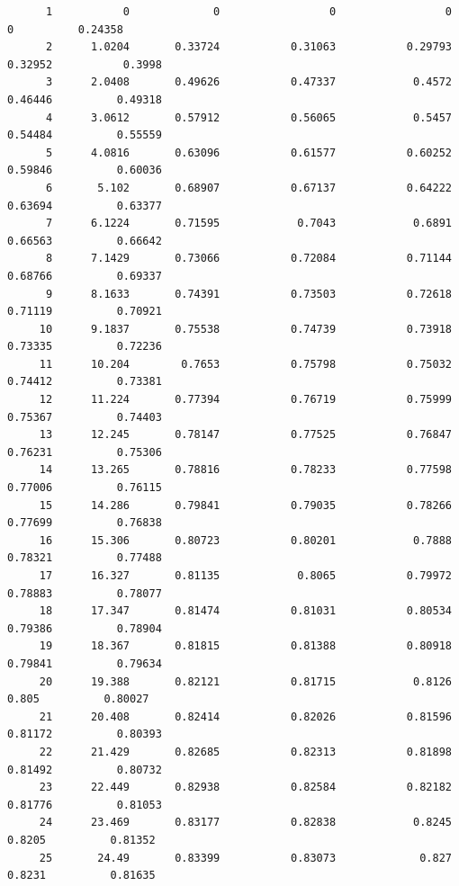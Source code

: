 \documentclass[
]{book}
\begin{document}
\begin{verbatim}
      1           0             0                 0                 0                 0          0.24358   
      2      1.0204       0.33724           0.31063           0.29793           0.32952           0.3998   
      3      2.0408       0.49626           0.47337            0.4572           0.46446          0.49318   
      4      3.0612       0.57912           0.56065            0.5457           0.54484          0.55559   
      5      4.0816       0.63096           0.61577           0.60252           0.59846          0.60036   
      6       5.102       0.68907           0.67137           0.64222           0.63694          0.63377   
      7      6.1224       0.71595            0.7043            0.6891           0.66563          0.66642   
      8      7.1429       0.73066           0.72084           0.71144           0.68766          0.69337   
      9      8.1633       0.74391           0.73503           0.72618           0.71119          0.70921   
     10      9.1837       0.75538           0.74739           0.73918           0.73335          0.72236   
     11      10.204        0.7653           0.75798           0.75032           0.74412          0.73381   
     12      11.224       0.77394           0.76719           0.75999           0.75367          0.74403   
     13      12.245       0.78147           0.77525           0.76847           0.76231          0.75306   
     14      13.265       0.78816           0.78233           0.77598           0.77006          0.76115   
     15      14.286       0.79841           0.79035           0.78266           0.77699          0.76838   
     16      15.306       0.80723           0.80201            0.7888           0.78321          0.77488   
     17      16.327       0.81135            0.8065           0.79972           0.78883          0.78077   
     18      17.347       0.81474           0.81031           0.80534           0.79386          0.78904   
     19      18.367       0.81815           0.81388           0.80918           0.79841          0.79634   
     20      19.388       0.82121           0.81715            0.8126             0.805          0.80027   
     21      20.408       0.82414           0.82026           0.81596           0.81172          0.80393   
     22      21.429       0.82685           0.82313           0.81898           0.81492          0.80732   
     23      22.449       0.82938           0.82584           0.82182           0.81776          0.81053   
     24      23.469       0.83177           0.82838            0.8245            0.8205          0.81352   
     25       24.49       0.83399           0.83073             0.827            0.8231          0.81635   

\end{verbatim}
\end{document}
